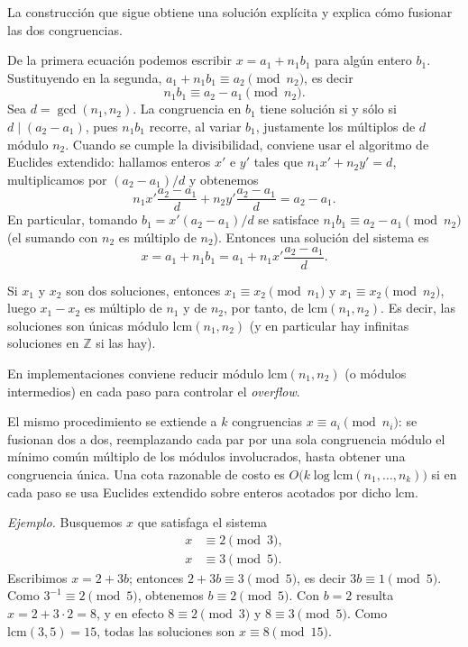 La construcción que sigue obtiene una solución explícita y explica cómo fusionar las dos congruencias.

De la primera ecuación podemos escribir $x = a_1 + n_1 b_1$ para algún entero $b_1$. Sustituyendo en la segunda, $a_1 + n_1 b_1 \equiv a_2 \pmod{n_2}$, es decir
\[
n_1 b_1 \equiv a_2 - a_1 \pmod{n_2}.
\]
Sea $d = \gcd(n_1, n_2)$. La congruencia en $b_1$ tiene solución si y sólo si $d \mid (a_2 - a_1)$, pues $n_1 b_1$ recorre, al variar $b_1$, justamente los múltiplos de $d$ módulo $n_2$. Cuando se cumple la divisibilidad, conviene usar el algoritmo de Euclides extendido: hallamos enteros $x'$ e $y'$ tales que $n_1 x' + n_2 y' = d$, multiplicamos por $(a_2 - a_1)/d$ y obtenemos
\[
n_1 x' \frac{a_2 - a_1}{d} + n_2 y' \frac{a_2 - a_1}{d} = a_2 - a_1.
\]
En particular, tomando $b_1 = x'(a_2 - a_1)/d$ se satisface $n_1 b_1 \equiv a_2 - a_1 \pmod{n_2}$ (el sumando con $n_2$ es múltiplo de $n_2$). Entonces una solución del sistema es
\[
x = a_1 + n_1 b_1 = a_1 + n_1 x' \frac{a_2 - a_1}{d}.
\]

Si $x_1$ y $x_2$ son dos soluciones, entonces $x_1 \equiv x_2 \pmod{n_1}$ y $x_1 \equiv x_2 \pmod{n_2}$, luego $x_1 - x_2$ es múltiplo de $n_1$ y de $n_2$, por tanto, de $\text{lcm}(n_1,n_2)$. Es decir, las soluciones son únicas módulo $\text{lcm}(n_1,n_2)$ (y en particular hay infinitas soluciones en $\mathbb{Z}$ si las hay).

En implementaciones conviene reducir módulo $\text{lcm}(n_1,n_2)$ (o módulos intermedios) en cada paso para controlar el \textit{overflow}.

El mismo procedimiento se extiende a $k$ congruencias $x \equiv a_i \pmod{n_i}$: se fusionan dos a dos, reemplazando cada par por una sola congruencia módulo el mínimo común múltiplo de los módulos involucrados, hasta obtener una congruencia única. Una cota razonable de costo es $O\bigl(k \log \text{lcm}(n_1,\ldots,n_k)\bigr)$ si en cada paso se usa Euclides extendido sobre enteros acotados por dicho lcm.

\textit{Ejemplo.} Busquemos $x$ que satisfaga el sistema
\begin{align*}
x &\equiv 2 \pmod{3}, \\
x &\equiv 3 \pmod{5}.
\end{align*}
Escribimos $x = 2 + 3b$; entonces $2 + 3b \equiv 3 \pmod{5}$, es decir $3b \equiv 1 \pmod{5}$. Como $3^{-1} \equiv 2 \pmod{5}$, obtenemos $b \equiv 2 \pmod{5}$. Con $b = 2$ resulta $x = 2 + 3\cdot 2 = 8$, y en efecto $8 \equiv 2 \pmod{3}$ y $8 \equiv 3 \pmod{5}$. Como $\text{lcm}(3,5)=15$, todas las soluciones son $x \equiv 8 \pmod{15}$.

